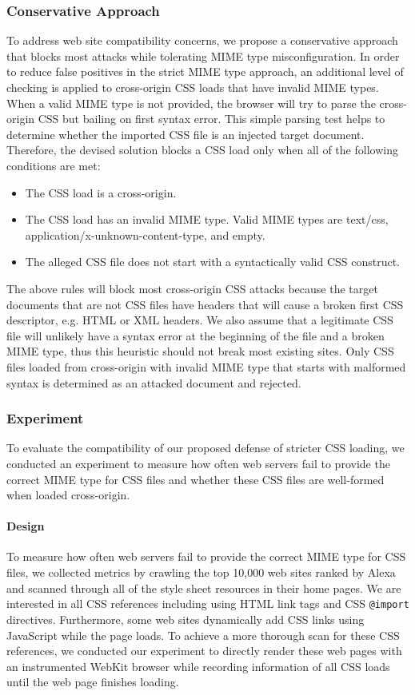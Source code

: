\documentclass{acm_proc_article-sp}
\begin{document}
{\subsubsection{Conservative Approach}
To address web site compatibility concerns, we propose a conservative approach that blocks most attacks while tolerating MIME type misconfiguration. In order to reduce false positives in the strict MIME type approach, an additional level of checking is applied to cross-origin CSS loads that have invalid MIME types. When a valid MIME type is not provided, the browser will try to parse the cross-origin CSS but bailing on first syntax error. This simple parsing test helps to determine whether the imported CSS file is an injected target document. Therefore, the devised solution blocks a CSS load only when all of the following conditions are met:
\begin{itemize}
\item{The CSS load is a cross-origin.}
\item{The CSS load has an invalid MIME type. Valid MIME types are text/css, application/x-unknown-content-type, and empty.}
\item{The alleged CSS file does not start with a syntactically valid CSS construct.}
\end{itemize}
The above rules will block most cross-origin CSS attacks because the target documents that are not CSS files have headers that will cause a broken first CSS descriptor, e.g. HTML or XML headers. We also assume that a legitimate CSS file will unlikely have a syntax error at the beginning of the file and a broken MIME type, thus this heuristic should not break most existing sites. Only CSS files loaded from cross-origin with invalid MIME type that starts with malformed syntax is determined as an attacked document and rejected.

\subsubsection{Experiment}
To evaluate the compatibility of our proposed defense of stricter CSS loading, we conducted an experiment to measure how often web servers fail to provide the correct MIME type for CSS files and whether these CSS files are well-formed when loaded cross-origin.

\paragraph{Design}
To measure how often web servers fail to provide the correct MIME type for CSS files, we collected metrics by crawling the top 10,000 web sites ranked by Alexa\cite{alexa} and scanned through all of the style sheet resources in their home pages. We are interested in all CSS references including using HTML link tags and CSS \texttt{@import} directives. Furthermore, some web sites dynamically add CSS links using JavaScript while the page loads. To achieve a more thorough scan for these CSS references, we conducted our experiment to directly render these web pages with an instrumented WebKit browser while recording information of all CSS loads until the web page finishes loading.

}
\end{document}
